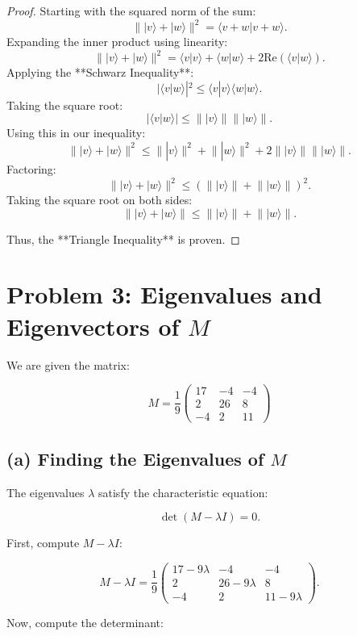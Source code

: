 \documentclass[12pt]{article}
\newcommand{\braket}[2]{\langle #1 | #2 \rangle}
\newcommand{\norm}[1]{\lVert #1 \rVert}
\begin{document}
\begin{proof}
Starting with the squared norm of the sum:
\[
\norm{|v\rangle + |w\rangle}^2 = \braket{v + w}{v + w}.
\]
Expanding the inner product using linearity:
\[
\norm{|v\rangle + |w\rangle}^2 = \braket{v}{v} + \braket{w}{w} + 2\text{Re}(\braket{v}{w}).
\]
Applying the **Schwarz Inequality**:
\[
|\braket{v}{w}|^2 \leq \braket{v}{v} \braket{w}{w}.
\]
Taking the square root:
\[
|\braket{v}{w}| \leq \norm{|v\rangle} \norm{|w\rangle}.
\]
Using this in our inequality:
\[
\norm{|v\rangle + |w\rangle}^2 \leq \norm{|v\rangle}^2 + \norm{|w\rangle}^2 + 2\norm{|v\rangle} \norm{|w\rangle}.
\]
Factoring:
\[
\norm{|v\rangle + |w\rangle}^2 \leq (\norm{|v\rangle} + \norm{|w\rangle})^2.
\]
Taking the square root on both sides:
\[
\norm{|v\rangle + |w\rangle} \leq \norm{|v\rangle} + \norm{|w\rangle}.
\]

Thus, the **Triangle Inequality** is proven.
\end{proof}



\section*{Problem 3: Eigenvalues and Eigenvectors of \( M \)}

We are given the matrix:

\[
M =
\frac{1}{9}
\begin{pmatrix}
17 & -4 & -4 \\
2 & 26 & 8 \\
-4 & 2 & 11
\end{pmatrix}
\]

\subsection*{(a) Finding the Eigenvalues of \( M \)}

The eigenvalues \( \lambda \) satisfy the characteristic equation:

\[
\det(M - \lambda I) = 0.
\]

First, compute \( M - \lambda I \):

\[
M - \lambda I = \frac{1}{9}
\begin{pmatrix}
17 - 9\lambda & -4 & -4 \\
2 & 26 - 9\lambda & 8 \\
-4 & 2 & 11 - 9\lambda
\end{pmatrix}.
\]

Now, compute the determinant:
\end{document}
